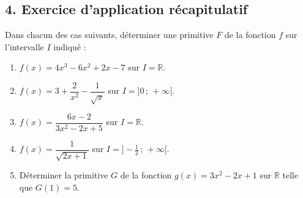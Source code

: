 \documentclass[12pt,a4paper]{article}
\begin{document}
\vspace{0.3cm}


\subsection*{\color{myred}4. Exercice d'application récapitulatif}

\begin{tcolorbox}[colback=yellow!5!white,colframe=myred,title=\textbf{Exercice d'entraînement}]
Dans chacun des cas suivants, déterminer une primitive $F$ de la fonction $f$ sur l'intervalle $I$ indiqué :

\begin{enumerate}
    \item $f(x) = 4x^3 - 6x^2 + 2x - 7$ sur $I = \mathbb{R}$.
    \item $f(x) = 3 + \dfrac{2}{x^2} - \dfrac{1}{\sqrt{x}}$ sur $I = ]0 \,;\, +\infty[$.
    \item $f(x) = \dfrac{6x - 2}{3x^2 - 2x + 5}$ sur $I = \mathbb{R}$.
    \item $f(x) = \dfrac{1}{\sqrt{2x + 1}}$ sur $I = ]-\frac{1}{2} \,;\, +\infty[$.
    \item Déterminer la primitive $G$ de la fonction $g(x) = 3x^2 - 2x + 1$ sur $\mathbb{R}$ telle que $G(1) = 5$.
\end{enumerate}
\end{tcolorbox}

\vspace{0.2cm}
\end{document}
